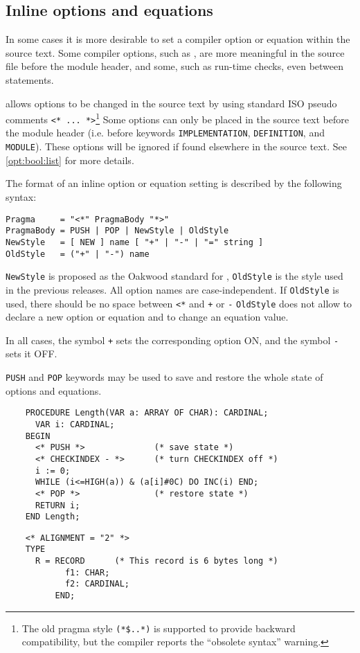 \subsection{Inline options and equations}\label{m2:pragmas:inline}

In some cases it is more desirable to set a compiler option or
equation within the source  text. Some compiler options,  such as
, are more meaningful in the source file before the
module header, and some, such as run-time checks, even between statements.

\xds{} allows options to be changed in the source text by using standard
ISO  pseudo comments \verb|<* ... *>|\footnote{The old pragma style
{\tt (*\$..*)} is supported to provide backward compatibility,
but the compiler reports the ``obsolete syntax'' warning.}
Some options can only be placed in the source text before the module
header (i.e. before keywords \verb'IMPLEMENTATION', \verb'DEFINITION',
and \verb'MODULE'). These options will be ignored if found elsewhere
in the source text. See \ref{opt:bool:list} for more details.

The format of an inline option or equation setting is described by
the following syntax:
\begin{verbatim}
Pragma     = "<*" PragmaBody "*>"
PragmaBody = PUSH | POP | NewStyle | OldStyle
NewStyle   = [ NEW ] name [ "+" | "-" | "=" string ]
OldStyle   = ("+" | "-") name
\end{verbatim}

{\tt NewStyle} is proposed as the Oakwood standard for \ot{},
{\tt OldStyle} is the style used in the previous \xds{} releases.  All
option names are case-independent.  If {\tt OldStyle} is used, 
there should be  no  space between \verb|<*| and \verb|+| or \verb|-|
{\tt OldStyle} does not allow to declare a new option or equation
and to change an equation value.

In all cases, the symbol \verb|+| sets the corresponding
option ON, and the symbol \verb|-| sets it OFF.

{\tt PUSH} and {\tt POP} keywords may be used to save and restore
the whole state of options and equations.

\Examples
\begin{verbatim}
    PROCEDURE Length(VAR a: ARRAY OF CHAR): CARDINAL;
      VAR i: CARDINAL;
    BEGIN
      <* PUSH *>              (* save state *)
      <* CHECKINDEX - *>      (* turn CHECKINDEX off *)
      i := 0;
      WHILE (i<=HIGH(a)) & (a[i]#0C) DO INC(i) END;
      <* POP *>               (* restore state *)
      RETURN i;
    END Length;
\end{verbatim}
\begin{verbatim}
    <* ALIGNMENT = "2" *>
    TYPE
      R = RECORD      (* This record is 6 bytes long *)
            f1: CHAR;
            f2: CARDINAL;
          END;
\end{verbatim}

